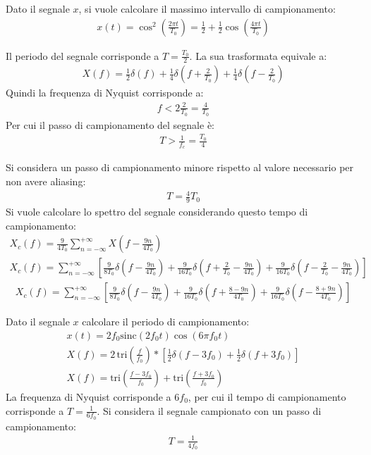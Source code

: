 \documentclass{article}
\newcommand{\sinc}{\mathrm{sinc}}
\newcommand{\tri}{\mathrm{tri}}
\begin{document}
Dato il segnale $x$, si vuole calcolare il massimo intervallo di campionamento:
\begin{gather*}
    x(t)=\cos^2\left(\displaystyle\frac{2\pi t}{T_0}\right)=\frac{1}{2}+\frac{1}{2}\cos\left(\frac{4\pi t}{T_0}\right)
\end{gather*}

Il periodo del segnale corrisponde a $T=\displaystyle\frac{T_0}{2}$. La sua trasformata equivale a:
\begin{gather*}
    X(f)=\displaystyle\frac{1}{2}\delta(f)+\frac{1}{4}\delta\left(f+\frac{2}{T_0}\right)+\frac{1}{4}\delta\left(f-\frac{2}{T_0}\right)
\end{gather*}
Quindi la frequenza di Nyquist corrisponde a:
\begin{gather*}
    f<2\frac{2}{T_0}=\frac{4}{T_0}
\end{gather*}
Per cui il passo di campionamento del segnale è:
\begin{gather}
    T>\displaystyle\frac{1}{f_c}=\frac{T_0}{4}
\end{gather}

Si considera un passo di campionamento minore rispetto al valore necessario per non avere aliasing: 
\begin{gather*}
    T=\frac{4}{9}T_0
\end{gather*}
Si vuole calcolare lo spettro del segnale considerando questo tempo di campionamento:
\begin{gather*}
    X_c(f)=\displaystyle\frac{9}{4T_0}\sum_{n=-\infty}^{+\infty}X\left(f-\frac{9n}{4T_0}\right)\\
    X_c(f)=\sum_{n=-\infty}^{+\infty}\left[\frac{9}{8T_0}\delta\left(f-\frac{9n}{4T_0}\right)+\frac{9}{16T_0}\delta\left(f+\frac{2}{T_0}-\frac{9n}{4T_0}\right)+\frac{9}{16T_0}\delta\left(f-\frac{2}{T_0}-\frac{9n}{4T_0}\right)\right]
\end{gather*}
\begin{gather}
    X_c(f)=\displaystyle\sum_{n=-\infty}^{+\infty}\left[\frac{9}{8T_0}\delta\left(f-\frac{9n}{4T_0}\right)+\frac{9}{16T_0}\delta\left(f+\frac{8-9n}{4T_0}\right)+\frac{9}{16T_0}\delta\left(f-\frac{8+9n}{4T_0}\right)\right]
\end{gather}

Dato il segnale $x$ calcolare il periodo di campionamento:
\begin{gather*}
    x(t)=2f_0\sinc(2f_0t)\cos(6\pi f_0t)\\
    X(f)=\displaystyle2\,\tri \left(\frac{f}{f_0}\right)*\left[\frac{1}{2}\delta\left(f-3f_0\right)+\frac{1}{2}\delta(f+3f_0)\right]\\
    X(f)=\displaystyle\tri \left(\frac{f-3f_0}{f_0}\right)+\tri \left(\frac{f+3f_0}{f_0}\right)
\end{gather*}
La frequenza di Nyquist corrisponde a $6f_0$, per cui il tempo di campionamento corrisponde a $T=\displaystyle\frac{1}{6f_0}$. Si considera il segnale campionato con un 
passo di campionamento:
\begin{gather*}
    T=\displaystyle\frac{1}{4f_0}
\end{gather*}
\end{document}
